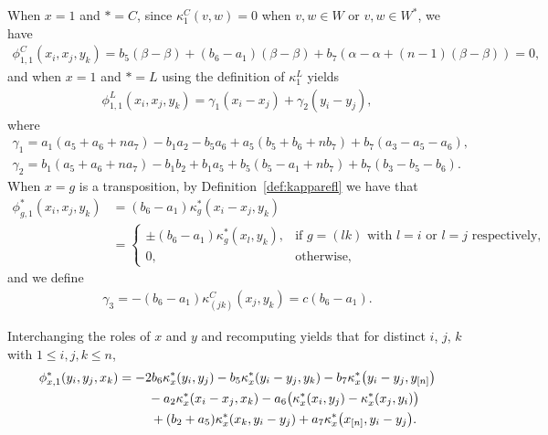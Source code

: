 \documentclass[10pt,a4paper]{amsart}
\numberwithin{equation}{section}
\begin{document}
When $x=1$ and $*=C$, since $\kappa^C_1(v,w)=0$ when $v,w \in W$ or $v,w \in W^*$, we have
\begin{gather*}
\phi_{1,1}^C(x_i,x_j,y_k)=b_5(\beta-\beta)+(b_6-a_1)(\beta-\beta) +b_7\left(\alpha-\alpha+(n-1)(\beta-\beta)\right)=0,
\end{gather*}
and when $x=1$ and $*=L$ using the definition of $\kappa^L_1$ yields
\begin{gather*}
\phi_{1,1}^L(x_i,x_j,y_k)=\gamma_1(x_i-x_j)+\gamma_2(y_i-y_j),
\end{gather*}
where
\begin{gather*}
\gamma_1=a_1(a_5 + a_6 + na_7) - b_1 a_2 - b_5 a_6 + a_5 (b_5 + b_6 + nb_7) + b_7 (a_3 - a_5 - a_6),
\\
\gamma_2=b_1(a_5 + a_6 + na_7) - b_1 b_2 + b_1 a_5 + b_5 (b_5 - a_1 + nb_7) + b_7 (b_3 - b_5 - b_6).
\end{gather*}
When $x=g$ is a transposition, by Definition~\ref{def:kapparefl} we have
that
\begin{align*}
\phi_{g,1}^*(x_i,x_j,y_k)&=(b_6 - a_1)\kappa^*_g(x_i-x_j,y_k) \\
&=
\begin{cases}
 \pm(b_6 - a_1)\kappa^*_g(x_l,y_k), & \text{if\ \ $g=(lk)$\ \ with\ \ $l=i$\ \ or\ \ $l=j$\ \ respectively}, \\
 0, & \text{otherwise},
\end{cases}
\end{align*}
and we define
\begin{gather*}
\gamma_3=-(b_6 - a_1)\kappa_{(jk)}^C(x_j,y_k)=c(b_6 - a_1).
\end{gather*}

Interchanging the roles of $x$ and $y$ and recomputing yields that for
distinct $i$, $j$, $k$ with $1 \leq i, j, k \leq n$,
\begin{gather*}
\phi_{x,1}^*(y_i,y_j,x_k)
=-2b_6 \kappa^*_x(y_i,y_j) - b_5 \kappa^*_x(y_i-y_j,y_k) - b_7 \kappa^*_x\big(y_i-y_j,y_{[n]}\big)
\\ \hphantom{\phi_{x,1}^*(y_i,y_j,x_k)=}
{}- a_2 \kappa^*_x(x_i-x_j,x_k)-a_6\big(\kappa^*_x(x_i,y_j) - \kappa^*_x(x_j,y_i)\big)
\\ \hphantom{\phi_{x,1}^*(y_i,y_j,x_k)=}
{}+(b_2 + a_5)\kappa^*_x(x_k,y_i-y_j) + a_7 \kappa^*_x\big(x_{[n]},y_i-y_j\big).
\end{gather*}
\end{document}
